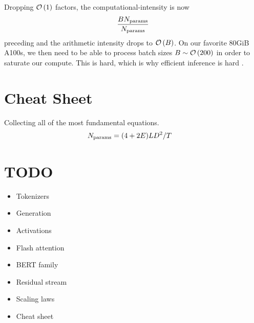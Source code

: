 \documentclass[11pt]{article}
\begin{document}
Dropping $ \mathcal{O} \left( 1 \right)  $ factors, the computational-intensity is now
\begin{align}
 \frac{ BN _{ {\rm params} } }{ N _{ {\rm params} } }
\end{align}
preceding and the arithmetic intensity drops to $ \mathcal{O} \left( B \right) $. On our
favorite 80GiB A100s, we then need to be able to process batch sizes $ B \sim \mathcal{O} \left( 200
\right)  $ in order to saturate our compute. This is hard, which is why efficient inference is hard
\cite{kipply_inference_math} .


\section{Cheat Sheet \label{app_cheat_sheet}}

Collecting all of the most fundamental equations.
\begin{align}
    N _{ {\rm params} } &= (4+2E)LD ^{ 2 } / T
\end{align}




 \section{TODO}


 \begin{itemize}
 \item Tokenizers
 \item Generation
 \item Activations
 \item Flash attention
 \item BERT family
 \item Residual stream
 \item Scaling laws
 \item Cheat sheet
 \end{itemize}



\end{document}
